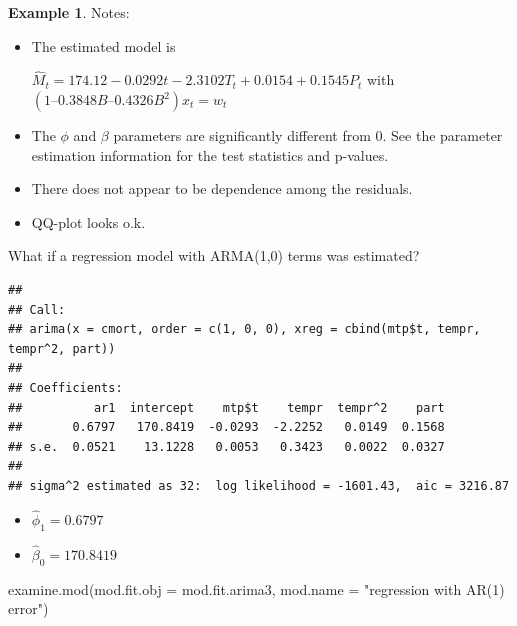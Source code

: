 \documentclass[
]{book}
\newenvironment{Shaded}{\begin{snugshade}}{\end{snugshade}}
\newcommand{\AttributeTok}[1]{\textcolor[rgb]{0.77,0.63,0.00}{#1}}
\newcommand{\DecValTok}[1]{\textcolor[rgb]{0.00,0.00,0.81}{#1}}
\newcommand{\FunctionTok}[1]{\textcolor[rgb]{0.00,0.00,0.00}{#1}}
\newcommand{\NormalTok}[1]{#1}
\newcommand{\OtherTok}[1]{\textcolor[rgb]{0.56,0.35,0.01}{#1}}
\newcommand{\SpecialCharTok}[1]{\textcolor[rgb]{0.00,0.00,0.00}{#1}}
\newcommand{\StringTok}[1]{\textcolor[rgb]{0.31,0.60,0.02}{#1}}
\theoremstyle{definition}
\theoremstyle{definition}
\newtheorem{example}{Example}[chapter]
\theoremstyle{definition}
\theoremstyle{definition}
\theoremstyle{remark}
\begin{document}
\begin{example}
Notes:

\begin{itemize}
\item
  The estimated model is

  \(\hat M_t= 174.12 - 0.0292t - 2.3102T_t + 0.0154 + 0.1545P_t\) with \((1 – 0.3848B – 0.4326B^2)x_t = w_t\)
\item
  The \(\phi\) and \(\beta\) parameters are significantly different from 0. See the parameter estimation information for the test statistics and p-values.
\item
  There does not appear to be dependence among the residuals.
\item
  QQ-plot looks o.k.
\end{itemize}

What if a regression model with ARMA(1,0) terms was estimated?

\begin{Shaded}
\end{Shaded}

\begin{verbatim}
## 
## Call:
## arima(x = cmort, order = c(1, 0, 0), xreg = cbind(mtp$t, tempr, tempr^2, part))
## 
## Coefficients:
##          ar1  intercept    mtp$t    tempr  tempr^2    part
##       0.6797   170.8419  -0.0293  -2.2252   0.0149  0.1568
## s.e.  0.0521    13.1228   0.0053   0.3423   0.0022  0.0327
## 
## sigma^2 estimated as 32:  log likelihood = -1601.43,  aic = 3216.87
\end{verbatim}

\begin{itemize}
\item
  \(\hat \phi_1=0.6797\)
\item
  \(\hat \beta_0=170.8419\)
\end{itemize}

\begin{Shaded}
\begin{Highlighting}[]
\FunctionTok{examine.mod}\NormalTok{(}\AttributeTok{mod.fit.obj =}\NormalTok{ mod.fit.arima3, mod.name}
    \OtherTok{=} \StringTok{"regression with AR(1) error"}\NormalTok{)}
\end{Highlighting}
\end{Shaded}


\end{example}
\end{document}
